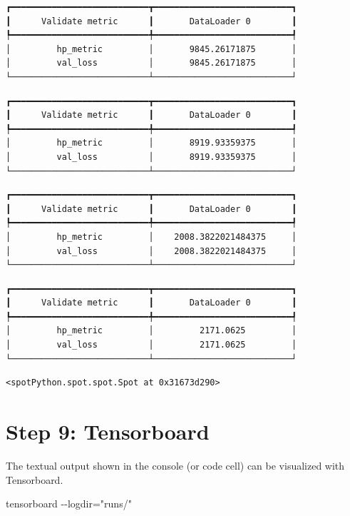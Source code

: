 \documentclass[
  letterpaper,
  DIV=11,
  numbers=noendperiod]{scrreprt}
\newenvironment{Shaded}{\begin{snugshade}}{\end{snugshade}}
\newcommand{\NormalTok}[1]{\textcolor[rgb]{0.00,0.23,0.31}{#1}}
\begin{document}
\begin{verbatim}
┏━━━━━━━━━━━━━━━━━━━━━━━━━━━┳━━━━━━━━━━━━━━━━━━━━━━━━━━━┓
┃      Validate metric      ┃       DataLoader 0        ┃
┡━━━━━━━━━━━━━━━━━━━━━━━━━━━╇━━━━━━━━━━━━━━━━━━━━━━━━━━━┩
│         hp_metric         │       9845.26171875       │
│         val_loss          │       9845.26171875       │
└───────────────────────────┴───────────────────────────┘
\end{verbatim}

\begin{verbatim}
┏━━━━━━━━━━━━━━━━━━━━━━━━━━━┳━━━━━━━━━━━━━━━━━━━━━━━━━━━┓
┃      Validate metric      ┃       DataLoader 0        ┃
┡━━━━━━━━━━━━━━━━━━━━━━━━━━━╇━━━━━━━━━━━━━━━━━━━━━━━━━━━┩
│         hp_metric         │       8919.93359375       │
│         val_loss          │       8919.93359375       │
└───────────────────────────┴───────────────────────────┘
\end{verbatim}

\begin{verbatim}
┏━━━━━━━━━━━━━━━━━━━━━━━━━━━┳━━━━━━━━━━━━━━━━━━━━━━━━━━━┓
┃      Validate metric      ┃       DataLoader 0        ┃
┡━━━━━━━━━━━━━━━━━━━━━━━━━━━╇━━━━━━━━━━━━━━━━━━━━━━━━━━━┩
│         hp_metric         │    2008.3822021484375     │
│         val_loss          │    2008.3822021484375     │
└───────────────────────────┴───────────────────────────┘
\end{verbatim}

\begin{verbatim}
┏━━━━━━━━━━━━━━━━━━━━━━━━━━━┳━━━━━━━━━━━━━━━━━━━━━━━━━━━┓
┃      Validate metric      ┃       DataLoader 0        ┃
┡━━━━━━━━━━━━━━━━━━━━━━━━━━━╇━━━━━━━━━━━━━━━━━━━━━━━━━━━┩
│         hp_metric         │         2171.0625         │
│         val_loss          │         2171.0625         │
└───────────────────────────┴───────────────────────────┘
\end{verbatim}

\begin{verbatim}
<spotPython.spot.spot.Spot at 0x31673d290>
\end{verbatim}

\section{Step 9: Tensorboard}\label{sec-tensorboard-31}

The textual output shown in the console (or code cell) can be visualized
with Tensorboard.

\begin{Shaded}
\begin{Highlighting}[]
\NormalTok{tensorboard {-}{-}logdir="runs/"}
\end{Highlighting}
\end{Shaded}
\end{document}
